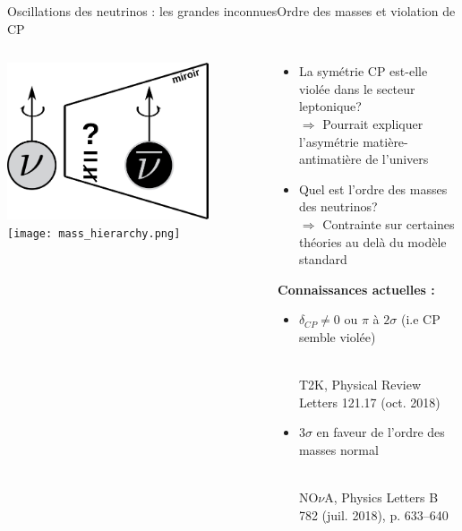     \begin{frame}{Oscillations des neutrinos : les grandes inconnues}{Ordre des masses et violation de CP}
        \begin{columns}
            \begin{column}{0.5\textwidth}
                \includegraphics[width=0.8\textwidth]{./pictures/CP_schema.png}\\
                \texttt{[image: mass\_hierarchy.png]}
            \end{column}
            \begin{column}{0.5\textwidth}
                \begin{scriptsize}
                    \begin{itemize}
                        \item La symétrie CP est-elle violée dans le secteur leptonique?  \\ $\Rightarrow$ Pourrait expliquer l'asymétrie matière-antimatière de l'univers
                        \item Quel est l'ordre des masses des neutrinos?  \\ $\Rightarrow$ Contrainte sur certaines théories au delà du modèle standard 
                    \end{itemize}
                    \vspace{0.4cm}
                    \textbf{Connaissances actuelles :}
                \end{scriptsize}
                \begin{itemize}
                    \item \begin{scriptsize}$\delta_{CP} \ne 0$ ou $\pi$ à $2\sigma$ (i.e CP semble violée)\end{scriptsize} \\  \tiny{T2K, Physical Review Letters 121.17 (oct. 2018)}
                    \item \begin{scriptsize}3$\sigma$ en faveur de l'ordre des masses normal\end{scriptsize} \\ \tiny{NO$\nu$A, Physics Letters B 782 (juil. 2018), p. 633–640}
                \end{itemize}
            \end{column}
        \end{columns}
    \end{frame}

